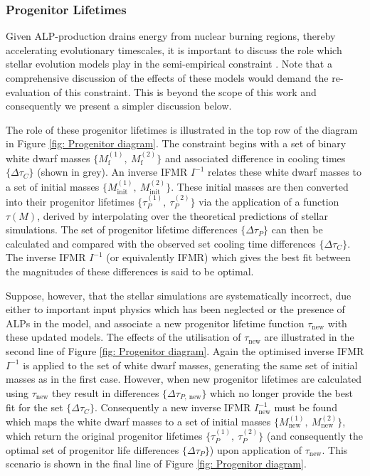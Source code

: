 \subsubsection*{Progenitor Lifetimes}
Given ALP-production drains energy from nuclear burning regions, thereby accelerating evolutionary timescales, it is important to discuss the role which stellar evolution models play in the semi-empirical constraint \cite{Andrews}. Note that a comprehensive discussion of the effects of these models would demand the re-evaluation of this constraint. This is beyond the scope of this work and consequently we present a simpler discussion below.

The role of these progenitor lifetimes is illustrated in the top row of the diagram in Figure \ref{fig: Progenitor diagram}. The constraint begins with a set of binary white dwarf masses $\{M_{\mathrm{f}}^{(1)},\ M_{\mathrm{f}}^{(2)}\}$ and associated difference in cooling times $\{\Delta\tau_C\}$ (shown in grey). An inverse IFMR $I^{-1}$ relates these white dwarf masses to a set of initial masses $\{M_{\mathrm{init}}^{(1)},\ M_{\mathrm{init}}^{(2)}\}$. These initial masses are then converted into their progenitor lifetimes $\{\tau_P^{(1)},\ \tau_P^{(2)}\}$ via the application of a function $\tau(M)$, derived by interpolating over the theoretical predictions of stellar simulations. The set of progenitor lifetime differences $\{\Delta\tau_{P}\}$ can then be calculated and compared with the observed set cooling time differences $\{\Delta\tau_C\}$. The inverse IFMR $I^{-1}$ (or equivalently IFMR) which gives the best fit between the magnitudes of these differences is said to be optimal.

Suppose, however, that the stellar simulations are systematically incorrect, due either to important input physics which has been neglected or the presence of ALPs in the model, and associate a new progenitor lifetime function $\tau_{\mathrm{new}}$ with these updated models. The effects of the utilisation of $\tau_{\mathrm{new}}$ are illustrated in the second line of Figure \ref{fig: Progenitor diagram}. Again the optimised inverse IFMR $I^{-1}$ is applied to the set of white dwarf masses, generating the same set of initial masses as in the first case. However, when new progenitor lifetimes are calculated using $\tau_{\mathrm{new}}$ they result in differences $\{\Delta\tau_{P,\ \mathrm{new}}\}$ which no longer provide the best fit for the set $\{\Delta\tau_C\}$. Consequently a new inverse IFMR $I_{\mathrm{new}}^{-1}$ must be found which maps the white dwarf masses to a set of initial masses $\{M_{\mathrm{new}}^{(1)},\ M_{\mathrm{new}}^{(2)}\}$, which return the original progenitor lifetimes  $\{\tau_P^{(1)},\ \tau_P^{(2)}\}$ (and consequently the optimal set of progenitor life differences $\{\Delta\tau_{P}\}$) upon application of $\tau_{\mathrm{new}}$. This scenario is shown in the final line of Figure \ref{fig: Progenitor diagram}.


